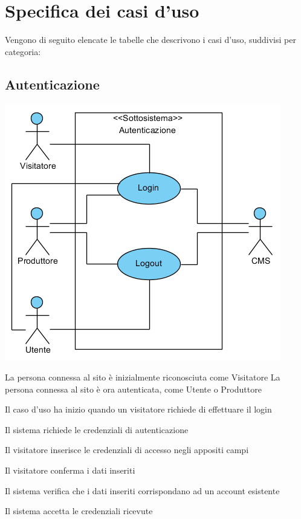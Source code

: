 \section{Specifica dei casi d'uso}
Vengono di seguito elencate le tabelle che descrivono i casi d'uso, suddivisi per categoria:

\subsection{Autenticazione}
\begin{center}
   \includegraphics[width=\textwidth]{assets/visualParadigm/Autenticazione}
\end{center}
%
{}%
{La persona connessa al sito è inizialmente riconosciuta come Visitatore}%
{La persona connessa al sito è ora autenticata, come Utente o Produttore}%
{\begin{enumCU}
	\item Il caso d'uso ha inizio quando un visitatore richiede di effettuare il login 
	\item Il sistema richiede le credenziali di autenticazione 
	\item Il visitatore inserisce le credenziali di accesso negli appositi campi \label{culogin:3}
	\item Il visitatore conferma i dati inseriti
	\item Il sistema verifica che i dati inseriti corrispondano ad un account esistente \label{culogin:5}
	\item Il sistema accetta le credenziali ricevute
\end{enumCU}}%
